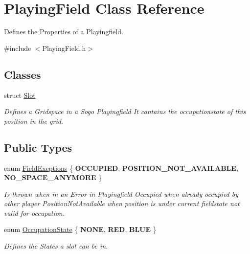 \hypertarget{classPlayingField}{\section{Playing\-Field Class Reference}
\label{classPlayingField}
}


Defines the Properties of a Playingfield.  




{\ttfamily \#include $<$Playing\-Field.\-h$>$}

\subsection*{Classes}
\begin{DoxyCompactItemize}
\item 
struct \hyperlink{structPlayingField_1_1Slot}{Slot}
\begin{DoxyCompactList}\small\item\em Defines a Gridspace in a Sogo Playingfield It contains the occupationstate of this position in the grid. \end{DoxyCompactList}\end{DoxyCompactItemize}
\subsection*{Public Types}
\begin{DoxyCompactItemize}
\item 
enum \hyperlink{classPlayingField_a6032d4d7297d628a368cde7db331d7f6}{Field\-Exeptions} \{ {\bfseries O\-C\-C\-U\-P\-I\-E\-D}, 
{\bfseries P\-O\-S\-I\-T\-I\-O\-N\-\_\-\-N\-O\-T\-\_\-\-A\-V\-A\-I\-L\-A\-B\-L\-E}, 
{\bfseries N\-O\-\_\-\-S\-P\-A\-C\-E\-\_\-\-A\-N\-Y\-M\-O\-R\-E}
 \}
\begin{DoxyCompactList}\small\item\em Is thrown when in an Error in Playingfield Occupied when already occupied by other player Position\-Not\-Available when position is under current fieldstate not valid for occupation. \end{DoxyCompactList}\item 
enum \hyperlink{classPlayingField_ac6df152a3f820aa04a00ab4df4a9d265}{Occupation\-State} \{ {\bfseries N\-O\-N\-E}, 
{\bfseries R\-E\-D}, 
{\bfseries B\-L\-U\-E}
 \}
\begin{DoxyCompactList}\small\item\em Defines the States a slot can be in. \end{DoxyCompactList}\end{DoxyCompactItemize}

